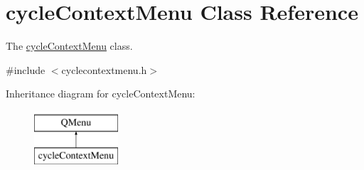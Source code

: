 \hypertarget{classcycle_context_menu}{}\section{cycle\+Context\+Menu Class Reference}
\label{classcycle_context_menu}


The \mbox{\hyperlink{classcycle_context_menu}{cycle\+Context\+Menu}} class.  




{\ttfamily \#include $<$cyclecontextmenu.\+h$>$}

Inheritance diagram for cycle\+Context\+Menu\+:\begin{figure}[H]
\begin{center}
\leavevmode
\includegraphics[height=2.000000cm]{classcycle_context_menu}
\end{center}
\end{figure}
